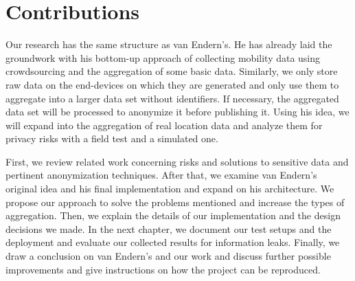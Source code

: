 \section{Contributions}
Our research has the same structure as van Endern's. He has already laid the groundwork with his bottom-up approach of collecting mobility data using crowdsourcing and the aggregation of some basic data. Similarly,  we only store raw data on the end-devices on which they are generated and only use them to aggregate into a larger data set without identifiers. If necessary, the aggregated data set will be processed to anonymize it before publishing it. Using his idea, we will expand into the aggregation of real location data and analyze them for privacy risks with a field test and a simulated one.

First, we review related work concerning risks and solutions to sensitive data and pertinent anonymization techniques. After that, we examine van Endern's original idea and his final implementation and expand on his architecture. We propose our approach to solve the problems mentioned and increase the types of aggregation. Then, we explain the details of our implementation and the design decisions we made. In the next chapter, we document our test setups and the deployment and evaluate our collected results for information leaks. Finally, we draw a conclusion on van Endern's and our work and discuss further possible improvements and give instructions on how the project can be reproduced.
